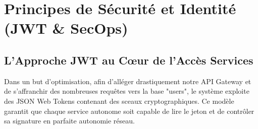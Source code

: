 \documentclass[12pt,a4paper]{article}
\begin{document}
\section{Principes de Sécurité et Identité (JWT \& SecOps)}

\subsection{L'Approche JWT au Cœur de l'Accès Services}
Dans un but d'optimisation, afin d'alléger drastiquement notre API Gateway et de s'affranchir des nombreuses requêtes vers la base "users", le système exploite des JSON Web Tokens contenant des sceaux cryptographiques. Ce modèle garantit que chaque service autonome soit capable de lire le jeton et de contrôler sa signature en parfaite autonomie réseau.
\end{document}

